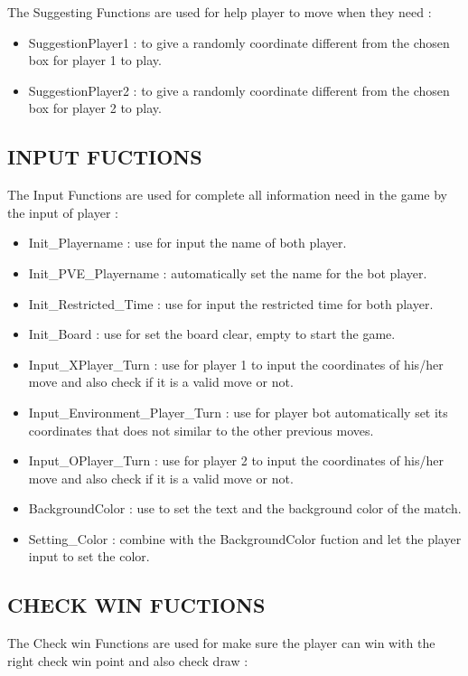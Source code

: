 \documentclass[12pt,a4paper]{article}
\begin{document}
The Suggesting Functions are used for help player to move when they need :
\begin{itemize}
    \item SuggestionPlayer1 : to give a randomly coordinate different from the chosen box for player 1 to play.
    \item SuggestionPlayer2 : to give a randomly coordinate different from the chosen box for player 2 to play.
\end{itemize}
\Large \subsection{\color{blue}\textbf{INPUT FUCTIONS} }
 The Input Functions are used for complete all information need in the game by the input of player :
\begin{itemize}
     \item Init\_Playername : use for input the name of both player.
     \item Init\_PVE\_Playername : automatically set the name for the bot player.
     \item Init\_Restricted\_Time : use for input the restricted time for both player.
     \item Init\_Board : use for set the board clear, empty to start the game.
     \item Input\_XPlayer\_Turn : use for player 1 to input the coordinates of his/her move and also check if it is a valid move or not.
     \item Input\_Environment\_Player\_Turn : use for player bot automatically set its coordinates that does not similar to the other previous moves.
     \item Input\_OPlayer\_Turn : use for player 2 to input the coordinates of his/her move and also check if it is a valid move or not.
     \item BackgroundColor : use to set the text and the background color of the match.
     \item Setting\_Color : combine with the BackgroundColor fuction and let the player input to set the color. 
\end{itemize}
\Large \subsection{\color{blue}\textbf{CHECK WIN FUCTIONS} }
 The Check win Functions are used for make sure the player can win with the right check win point and also check draw :
\end{document}

